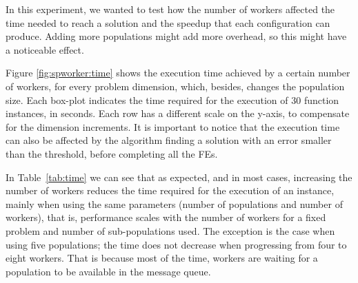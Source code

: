 \documentclass[review]{elsarticle}
\begin{document}

In this experiment, we wanted to test how the number of workers affected the
time needed to reach a solution and the speedup that each configuration can
produce. Adding more populations might add more overhead, so this might have a
noticeable effect. 


Figure \ref{fig:spworker:time} shows the execution time achieved by a certain number of
workers, for every problem dimension, which, besides, changes the
population size.
Each box-plot indicates the time required for the execution of 30 function
instances, in seconds. Each row has a different scale on the y-axis, to
compensate for the dimension increments. It is important to notice that the
execution time can also be affected by the algorithm finding a solution with an
error smaller than the threshold, before completing all the FEs. 

In Table~\ref{tab:time} we can see that as expected, and in most cases, 
increasing the number of workers reduces the time
required for the execution of an instance, 
mainly when using the same parameters
(number of populations and number of workers), that is, performance
scales with the number of workers for a fixed problem and number of
sub-populations used. The exception is the case when using five populations;
the time does not decrease when progressing from four to eight workers.  
That is because most of the time, workers are waiting for a population 
to be available in the message queue.
\end{document}
